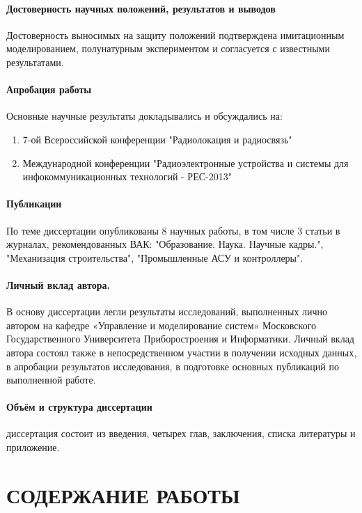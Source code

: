 \paragraph{Достоверность научных положений, результатов и выводов}
Достоверность выносимых на защиту положений подтверждена имитационным моделированием, полунатурным экспериментом и согласуется
с известными результатами.

\paragraph{Апробация работы}
Основные научные результаты докладывались и обсуждались на:
\begin{enumerate}
	\item 7-ой Всероссийской конференции "Радиолокация и радиосвязь"
	\item Международной конференции "Радиоэлектронные устройства и системы для инфокоммуникационных технологий - РЕС-2013"
\end{enumerate}

\paragraph{Публикации}
По теме диссертации опубликованы 8 научных работы, в том числе 3 статьи в журналах, рекомендованных ВАК:
"Образование. Наука. Научные кадры.", "Механизация строительства", "Промышленные АСУ и контроллеры".

\paragraph{Личный вклад автора.}
В основу диссертации легли результаты исследований, выполненных лично автором на кафедре «Управление и моделирование систем» Московского Государственного
Университета Приборостроения и Информатики. Личный вклад автора состоял также в непосредственном участии в получении исходных данных, в апробации результатов исследования,
в подготовке основных публикаций по выполненной работе.

\paragraph{Объём и структура диссертации}
диссертация состоит из введения, четырех глав, заключения, списка литературы и приложение.

\section*{СОДЕРЖАНИЕ РАБОТЫ}





%
%
%
%
%



\newpage
